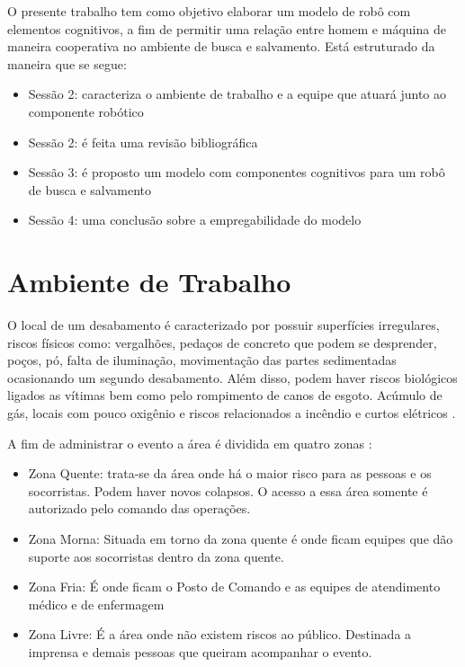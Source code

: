 \documentclass[
	article,			%
	11pt,				%
	oneside,			%
	a4paper,			%
	english,			%
	brazil,				%
	sumario=tradicional	
	]{abntex2}
\begin{document}
O presente trabalho tem como objetivo elaborar um modelo de robô com elementos cognitivos, a fim de permitir uma relação entre homem e máquina de maneira cooperativa no ambiente de busca e salvamento. Está estruturado da maneira que se segue:  

\begin{itemize}
\item Sessão 2: caracteriza o ambiente de trabalho e a equipe que atuará junto ao componente robótico
\item Sessão 2: é feita uma revisão bibliográfica
\item Sessão 3: é proposto um modelo com componentes cognitivos para um robô de busca e salvamento
\item Sessão 4: uma conclusão sobre a empregabilidade do modelo
\end{itemize}

\section{Ambiente de Trabalho}
O local de um desabamento é caracterizado por possuir superfícies irregulares, riscos físicos como: vergalhões, pedaços de concreto que podem se desprender, poços, pó, falta de iluminação, movimentação das partes sedimentadas ocasionando um segundo desabamento. Além disso, podem haver riscos biológicos ligados as vítimas bem como pelo rompimento de canos de esgoto. Acúmulo de gás, locais com pouco oxigênio e riscos relacionados a incêndio e curtos elétricos  \cite{Robin2004}.

A fim de administrar o evento a área é dividida em quatro zonas \cite{bomsp}:

\begin{itemize}
\item Zona Quente: trata-se da área onde há o maior risco para as pessoas e os socorristas. Podem haver novos colapsos. O acesso a essa área somente é autorizado pelo comando das operações.
\item Zona Morna: Situada em torno da zona quente é onde ficam equipes que dão suporte aos socorristas dentro da zona quente.
\item Zona Fria: É onde ficam o Posto de Comando e as equipes de atendimento médico e de enfermagem
\item Zona Livre: É a área onde não existem riscos ao público. Destinada a imprensa e demais pessoas que queiram acompanhar o evento.
\end{itemize}
\end{document}
